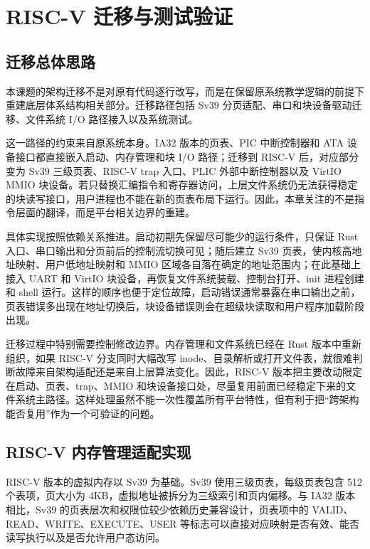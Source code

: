 \chapter{RISC-V 迁移与测试验证}

\section{迁移总体思路}

本课题的架构迁移不是对原有代码逐行改写，而是在保留原系统教学逻辑的前提下重建底层体系结构相关部分。迁移路径包括 Sv39 分页适配、串口和块设备驱动迁移、文件系统 I/O 路径接入以及系统测试。

这一路径的约束来自原系统本身。IA32 版本的页表、PIC 中断控制器和 ATA 设备接口都直接嵌入启动、内存管理和块 I/O 路径；迁移到 RISC-V 后，对应部分变为 Sv39 三级页表、RISC-V trap 入口、PLIC 外部中断控制器以及 VirtIO MMIO 块设备。若只替换汇编指令和寄存器访问，上层文件系统仍无法获得稳定的块读写接口，用户进程也不能在新的页表布局下运行。因此，本章关注的不是指令层面的翻译，而是平台相关边界的重建。

具体实现按照依赖关系推进。启动初期先保留尽可能少的运行条件，只保证 Rust 入口、串口输出和分页前后的控制流切换可见；随后建立 Sv39 页表，使内核高地址映射、用户低地址映射和 MMIO 区域各自落在确定的地址范围内；在此基础上接入 UART 和 VirtIO 块设备，再恢复文件系统装载、控制台打开、init 进程创建和 shell 运行。这样的顺序也便于定位故障，启动错误通常暴露在串口输出之前，页表错误多出现在地址切换后，块设备错误则会在超级块读取和用户程序加载阶段出现。

迁移过程中特别需要控制修改边界。内存管理和文件系统已经在 Rust 版本中重新组织，如果 RISC-V 分支同时大幅改写 inode、目录解析或打开文件表，就很难判断故障来自架构适配还是来自上层算法变化。因此，RISC-V 版本把主要改动限定在启动、页表、trap、MMIO 和块设备接口处，尽量复用前面已经稳定下来的文件系统主路径。这样处理虽然不能一次性覆盖所有平台特性，但有利于把“跨架构能否复用”作为一个可验证的问题。

\section{RISC-V 内存管理适配实现}

RISC-V 版本的虚拟内存以 Sv39 为基础。Sv39 使用三级页表，每级页表包含 512 个表项，页大小为 4KB，虚拟地址被拆分为三级索引和页内偏移。与 IA32 版本相比，Sv39 的页表层次和权限位较少依赖历史兼容设计，页表项中的 VALID、READ、WRITE、EXECUTE、USER 等标志可以直接对应映射是否有效、能否读写执行以及是否允许用户态访问。

